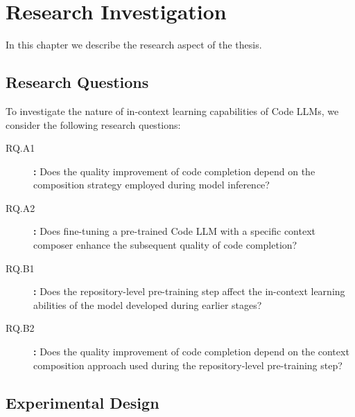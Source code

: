 \chapter{Research Investigation}\label{chap:research-investigation}  %


In this chapter we describe the research aspect of the thesis.  %


\section{Research Questions}

To investigate the nature of in-context learning capabilities of Code LLMs, we consider the following research questions:

\begin{sloppypar}
\begin{description}
    \item[RQ.A1]\label{rq:rq-a1} \textbf{:} Does the quality improvement of code completion depend on the composition strategy employed during model inference?
    \item[RQ.A2]\label{rq:rq-a2} \textbf{:} Does fine-tuning a pre-trained Code LLM with a specific context composer enhance the subsequent quality of code completion?
    \item[RQ.B1]\label{rq:rq-b1} \textbf{:} Does the repository-level pre-training step affect the in-context learning abilities of the model developed during earlier stages?
    \item[RQ.B2]\label{rq:rq-b2} \textbf{:} Does the quality improvement of code completion depend on the context composition approach used during the repository-level pre-training step?
\end{description}
\end{sloppypar}

\section{Experimental Design}

